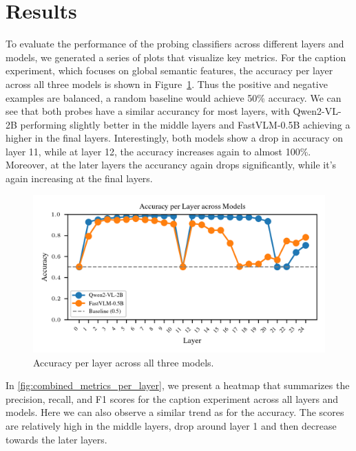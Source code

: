 \documentclass[11pt]{article}
\begin{document}
\section{Results}
To evaluate the performance of the probing classifiers across different layers
and models, we generated a series of plots that visualize key metrics.
For the caption experiment, which focuses on global semantic features, the accuracy per layer
across all three models is shown in Figure~\ref{fig:accuracy_per_layer}.
Thus the positive and negative examples are balanced, a random baseline would achieve 50\% accuracy.
We can see that both probes have a similar accurancy for most layers, with Qwen2-VL-2B performing slightly better in the middle layers and FastVLM-0.5B achieving a higher in the final layers.
Interestingly, both models show a drop in accuracy on layer 11, while at layer 12, the accuracy increases again to almost 100\%. Moreover, at the later layers the accurancy again drops significantly, while it's again increasing at the final layers.
\begin{figure}[H]
    \centering
    \includegraphics[width=1\linewidth]{figures/global/_combined_exp1/accuracy_lines_per_layer.png}
    \caption{Accuracy per layer across all three models.}
    \label{fig:accuracy_per_layer}
\end{figure}
In \ref{fig:combined_metrics_per_layer}, we present a heatmap that summarizes the precision, recall, and F1 scores for the caption experiment across all layers and models.
Here we can also observe a similar trend as for the accuracy. The scores are relatively high in the middle layers, drop around layer 1 and then decrease towards the later layers.
\end{document}
